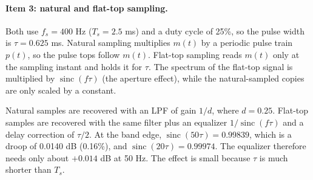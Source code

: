 \documentclass[a4paper]{article}
\begin{document}
\paragraph{Item 3: natural and flat-top sampling.}
Both use $f_s=400$ Hz ($T_s=2.5$ ms) and a duty cycle of 25\%, so the pulse width is $\tau=0.625$ ms. Natural sampling multiplies $m(t)$ by a periodic pulse train $p(t)$, so the pulse tops follow $m(t)$. Flat-top sampling reads $m(t)$ only at the sampling instant and holds it for $\tau$. The spectrum of the flat-top signal is multiplied by $\operatorname{sinc}(f\tau)$ (the aperture effect), while the natural-sampled copies are only scaled by a constant.

Natural samples are recovered with an LPF of gain $1/d$, where $d=0.25$. Flat-top samples are recovered with the same filter plus an equalizer $1/\operatorname{sinc}(f\tau)$ and a delay correction of $\tau/2$. At the band edge, $\operatorname{sinc}(50\tau)=0.99839$, which is a droop of 0.0140 dB (0.16\%), and $\operatorname{sinc}(20\tau)=0.99974$. The equalizer therefore needs only about $+0.014$ dB at 50 Hz. The effect is small because $\tau$ is much shorter than $T_s$.

\end{document}
